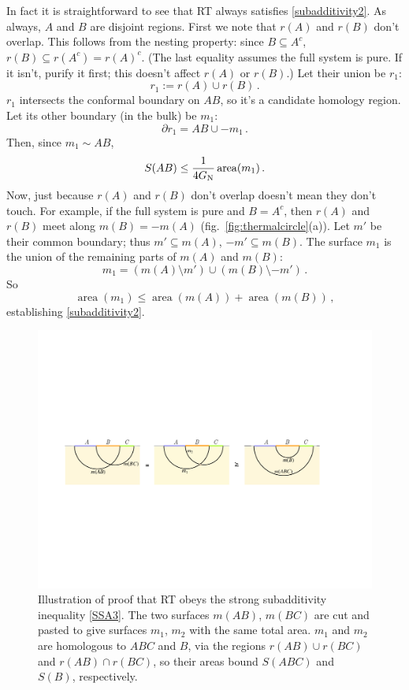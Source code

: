 \documentclass[11pt]{article}
\DeclareMathOperator{\area}{area}
\begin{document}
In fact it is straightforward to see that RT always satisfies \eqref{subadditivity2}. As always, $A$ and $B$ are disjoint regions. First we note that $r(A)$ and $r(B)$ don't overlap. This follows from the nesting property: since $B\subseteq A^c$, $r(B)\subseteq r(A^c)=r(A)^c$. (The last equality assumes the full system is pure. If it isn't, purify it first; this doesn't affect $r(A)$ or $r(B)$.) Let their union be $r_1$:
\begin{equation}
r_1 := r(A)\cup r(B)\,.
\end{equation}
$r_1$ intersects the conformal boundary on $AB$, so it's a candidate homology region. Let its other boundary (in the bulk) be $m_1$:
\begin{equation}
\partial r_1 = AB\cup-m_1\,.
\end{equation}
Then, since $m_1\sim AB$,
\begin{equation}
S(AB)\le\frac1{4G_{\rm N}}\area(m_1)\,.
\end{equation}
Now, just because $r(A)$ and $r(B)$ don't overlap doesn't mean they don't touch. For example, if the full system is pure and $B=A^c$, then $r(A)$ and $r(B)$ meet along $m(B)=-m(A)$ (fig.\ \ref{fig:thermalcircle}(a)). Let $m'$ be their common boundary; thus $m'\subseteq m(A)$, $-m'\subseteq m(B)$. The surface $m_1$ is the union of the remaining parts of $m(A)$ and $m(B)$:
\begin{equation}
m_1 = (m(A)\setminus m')\cup(m(B)\setminus -m')\,.
\end{equation}
So
\begin{equation}
\area(m_1) \le\area(m(A))+\area(m(B))\,,
\end{equation}
establishing \eqref{subadditivity2}.

\begin{figure}[tbp]
\centering
\includegraphics[width=\textwidth]{figs/SSA}
\caption{\label{fig:SSA}
Illustration of proof that RT obeys the strong subadditivity inequality \eqref{SSA3}. The two surfaces $m(AB)$, $m(BC)$ are cut and pasted to give surfaces $m_1$, $m_2$ with the same total area. $m_1$ and $m_2$ are homologous to $ABC$ and $B$, via the regions $r(AB)\cup r(BC)$ and $r(AB)\cap r(BC)$, so their areas bound $S(ABC)$ and $S(B)$, respectively.
}
\end{figure}
\end{document}
